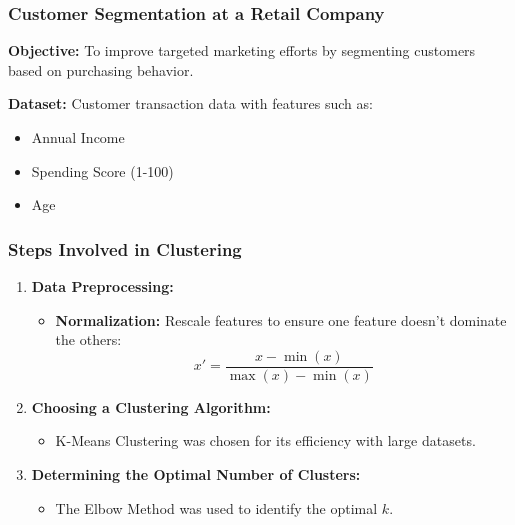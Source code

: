 \documentclass[aspectratio=169]{beamer}
\begin{document}
\begin{frame}
  \frametitle{Customer Segmentation at a Retail Company}
  
  \textbf{Objective:} To improve targeted marketing efforts by segmenting customers based on purchasing behavior.
  
  \textbf{Dataset:} Customer transaction data with features such as:
  \begin{itemize}
    \item Annual Income
    \item Spending Score (1-100)
    \item Age
  \end{itemize}
\end{frame}

\begin{frame}
  \frametitle{Steps Involved in Clustering}
  
  \begin{enumerate}
    \item \textbf{Data Preprocessing:}
      \begin{itemize}
        \item \textbf{Normalization:} Rescale features to ensure one feature doesn’t dominate the others:
        \begin{equation}
        x' = \frac{x - \min(x)}{\max(x) - \min(x)}
        \end{equation}
      \end{itemize}
      
    \item \textbf{Choosing a Clustering Algorithm:}
      \begin{itemize}
        \item K-Means Clustering was chosen for its efficiency with large datasets.
      \end{itemize}
      
    \item \textbf{Determining the Optimal Number of Clusters:}
      \begin{itemize}
        \item The Elbow Method was used to identify the optimal \( k \).
      \end{itemize}
  \end{enumerate}
\end{frame}
\end{document}
